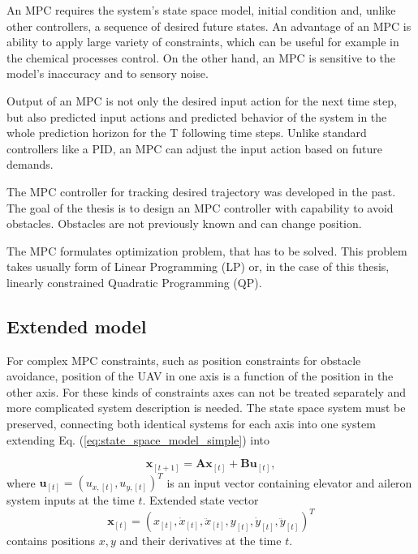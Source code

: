 \documentclass[a4paper,11pt,titlepage]{article}
\begin{document}
An MPC requires the system's state space model, initial condition and, unlike other controllers, a sequence of desired future states. An advantage of an MPC is ability to apply large variety of constraints, which can be useful for example in the chemical processes control. On the other hand, an MPC is sensitive to the model's inaccuracy and to sensory noise. 

Output of an MPC is not only the desired input action for the next time step, but also predicted input actions and predicted behavior of the system in the whole prediction horizon for the T following time steps. Unlike standard controllers like a PID, an MPC can adjust the input action based on future demands.

The MPC controller for tracking desired trajectory was developed \cite{tomas} in the past. The goal of the thesis is to design an MPC controller with capability to avoid obstacles. Obstacles are not previously known and can change position.

The MPC formulates optimization problem, that has to be solved. This problem takes usually form of Linear Programming (LP) or, in the case of this thesis, linearly constrained Quadratic Programming (QP).



\subsection{Extended model}		%
For complex MPC constraints, such as position constraints for obstacle avoidance, position of the UAV in one axis is a function of the position in the other axis. For these kinds of constraints axes can not be treated separately and more complicated system description is needed. The state space system must be preserved, connecting both identical systems for each axis into one system extending Eq. (\ref{eq:state_space_model_simple}) into 

\begin{equation}
\label{eq:state_space_model_simple}
\textbf{x}_{[t+1]} = \textbf{A} \textbf{x}_{[t]} +\textbf{B} \textbf{u}_{[t]},
\end{equation}
where $\textbf{u}_{[t]} = (u_{x,[t]}, u_{y,[t]})^T$ is an input vector containing elevator and aileron system inputs at the time $t$. Extended state vector 
\begin{equation}
\textbf{x}_{[t]} = (x_{[t]}, \dot{x}_{[t]}, \ddot{x}_{[t]}, y_{[t]}, \dot{y}_{[t]}, \ddot{y}_{[t]})^T
\end{equation}
contains positions $x,y$ and their derivatives at the time $t$. 
\end{document}
